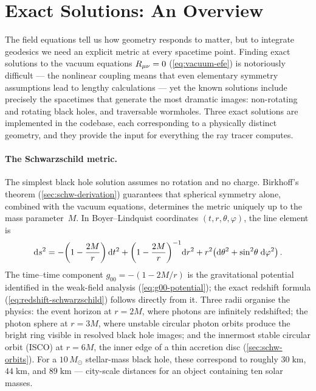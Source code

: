 \section{Exact Solutions: An Overview}
\label{sec:gr-exact-solutions}

The field equations tell us how geometry responds to matter, but to
integrate geodesics we need an explicit metric at every spacetime
point.  Finding exact solutions to the vacuum equations $R_{\mu\nu} = 0$
(\cref{eq:vacuum-efe}) is notoriously difficult --- the nonlinear
coupling means that even elementary symmetry assumptions lead to
lengthy calculations --- yet the known solutions include precisely the
spacetimes that generate the most dramatic images: non-rotating and
rotating black holes, and traversable wormholes.  Three exact solutions
are implemented in the codebase, each corresponding to a physically
distinct geometry, and they provide the input for everything the ray
tracer computes.

\paragraph{The Schwarzschild metric.}

The simplest black hole solution assumes no rotation and no charge.
Birkhoff's theorem (\cref{sec:schw-derivation}) guarantees that
spherical symmetry alone, combined with the vacuum equations,
determines the metric uniquely up to the mass parameter~$M$.  In
Boyer--Lindquist coordinates $(t, r, \theta, \varphi)$, the line
element is
%
\begin{equation}
  \mathrm{d} s^2 = -\!\left(1 - \frac{2M}{r}\right)\mathrm{d} t^2
           + \left(1 - \frac{2M}{r}\right)^{-1}\!\mathrm{d} r^2
           + r^2\!\left(\mathrm{d}\theta^2 + \sin^2\!\theta\;\mathrm{d}\varphi^2\right) .
  \label{eq:schwarzschild-metric}
\end{equation}
%
The time--time component $g_{00} = -(1 - 2M/r)$ is the gravitational
potential identified in the weak-field analysis (\cref{eq:g00-potential});
the exact redshift formula (\cref{eq:redshift-schwarzschild}) follows
directly from it.  Three radii organise the physics: the event
horizon at $r = 2M$, where photons are infinitely redshifted; the
photon sphere at $r = 3M$, where unstable circular photon orbits
produce the bright ring visible in resolved black hole images; and the
innermost stable circular orbit (ISCO) at $r = 6M$, the inner edge
of a thin accretion disc (\cref{sec:schw-orbits}).  For a
$10\,M_\odot$ stellar-mass black hole, these correspond to roughly
$30\;\text{km}$, $44\;\text{km}$, and $89\;\text{km}$ --- city-scale
distances for an object containing ten solar masses.

